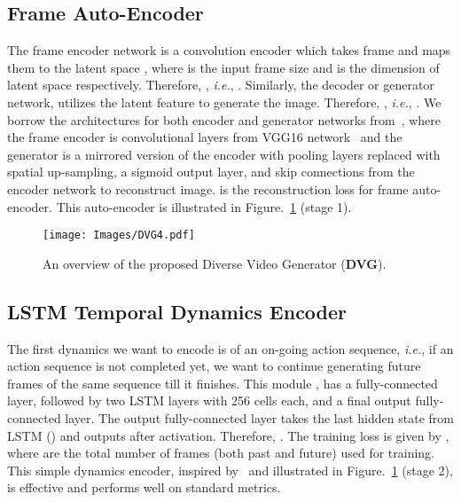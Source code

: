 \documentclass{article} \usepackage{iclr2021_conference,times}
\def\ie{\emph{i.e.}}
\begin{document}
\subsection{Frame Auto-Encoder} 
\vspace{-0.05in}
The frame encoder network is a convolution encoder which takes frame   and maps them to the latent space , where  is the input frame size and  is the dimension of latent space respectively. Therefore, , \ie, . Similarly, the decoder or generator network, utilizes the latent feature to generate the image. Therefore, , \ie, . We borrow the architectures for both encoder and generator networks from~\citep{denton2018stochastic}, where the frame encoder is convolutional layers from VGG16 network~\citep{simonyan2015deep} and the generator is a mirrored version of the encoder with pooling layers replaced with spatial up-sampling, a sigmoid output layer, and skip connections from the encoder network to reconstruct image.  is the reconstruction loss for frame auto-encoder. This auto-encoder is illustrated in Figure.~\ref{fig:ours} (stage 1).
\begin{figure}[t]
\texttt{[image: Images/DVG4.pdf]}
\caption{An overview of the proposed Diverse Video Generator (\textbf{DVG}).}
\label{fig:ours}
\vspace{-.2in}
\end{figure}
\vspace{-0.05in}
\subsection{LSTM Temporal Dynamics Encoder}
\vspace{-0.05in}
The first dynamics we want to encode is of an on-going action sequence, \ie, if an action sequence is not completed yet, we want to continue generating future frames of the same sequence till it finishes. This module , has a fully-connected layer, followed by two LSTM layers with 256 cells each, and a final output fully-connected layer. The output fully-connected layer takes the last hidden state from LSTM () and outputs  after  activation. Therefore, . The training loss is given by , 
where  are the total number of frames (both past and future) used for training. This simple dynamics encoder, inspired by~\citep{Srivastava:2015:ULV:3045118.3045209} and illustrated in Figure.~\ref{fig:ours} (stage 2), is effective and performs well on standard metrics. 

\vspace{-0.05in}
\end{document}

